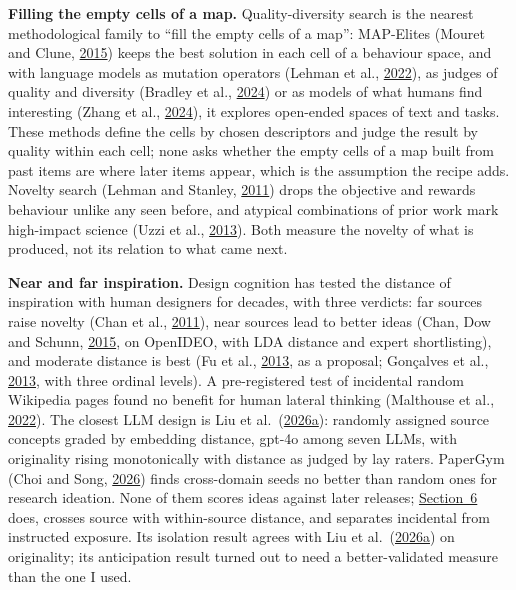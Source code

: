 \documentclass[
  10pt,
]{article}
\begin{document}
\textbf{Filling the empty cells of a
map.} Quality-diversity search is the
nearest methodological family to ``fill
the empty cells of a map'': MAP-Elites
(Mouret and Clune,
\hyperlink{ref-Mouret2015}{2015}) keeps
the best solution in each cell of a
behaviour space, and with language
models as mutation operators (Lehman et
al., \hyperlink{ref-Lehman2022}{2022}),
as judges of quality and diversity
(Bradley et al.,
\hyperlink{ref-Bradley2024}{2024}) or as
models of what humans find interesting
(Zhang et al.,
\hyperlink{ref-Zhang2024}{2024}), it
explores open-ended spaces of text and
tasks. These methods define the cells by
chosen descriptors and judge the result
by quality within each cell; none asks
whether the empty cells of a map built
from past items are where later items
appear, which is the assumption the
recipe adds. Novelty search (Lehman and
Stanley,
\hyperlink{ref-Lehman2011}{2011}) drops
the objective and rewards behaviour
unlike any seen before, and atypical
combinations of prior work mark
high-impact science (Uzzi et al.,
\hyperlink{ref-Uzzi2013}{2013}). Both
measure the novelty of what is produced,
not its relation to what came next.

\textbf{Near and far inspiration.}
Design cognition has tested the distance
of inspiration with human designers for
decades, with three verdicts: far
sources raise novelty (Chan et al.,
\hyperlink{ref-Chan2011}{2011}), near
sources lead to better ideas (Chan, Dow
and Schunn,
\hyperlink{ref-Chan2015}{2015}, on
OpenIDEO, with LDA distance and expert
shortlisting), and moderate distance is
best (Fu et al.,
\hyperlink{ref-Fu2013}{2013}, as a
proposal; Gonçalves et al.,
\hyperlink{ref-Gon�alves2013}{2013},
with three ordinal levels). A
pre-registered test of incidental random
Wikipedia pages found no benefit for
human lateral thinking (Malthouse et
al.,
\hyperlink{ref-Malthouse2022}{2022}).
The closest LLM design is Liu et
al.~(\hyperlink{ref-Liu2026a}{2026a}):
randomly assigned source concepts graded
by embedding distance, gpt-4o among
seven LLMs, with originality rising
monotonically with distance as judged by
lay raters. PaperGym (Choi and Song,
\hyperlink{ref-Choi2026}{2026}) finds
cross-domain seeds no better than random
ones for research ideation. None of them
scores ideas against later releases;
\hyperref[sec:6]{Section~6} does,
crosses source with within-source
distance, and separates incidental from
instructed exposure. Its isolation
result agrees with Liu et
al.~(\hyperlink{ref-Liu2026a}{2026a}) on
originality; its anticipation result
turned out to need a better-validated
measure than the one I used.
\end{document}
